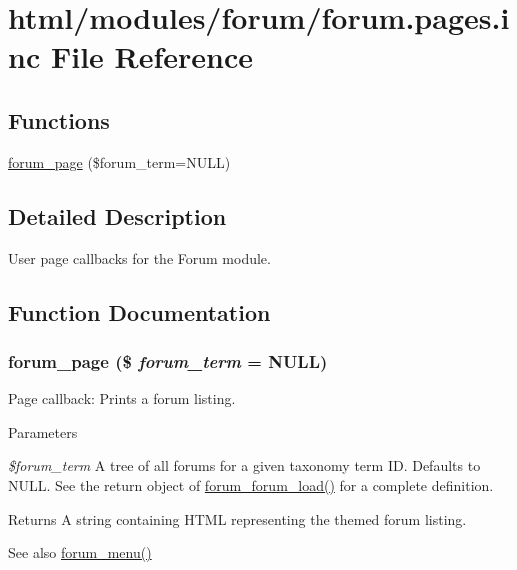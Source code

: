 \hypertarget{forum_8pages_8inc}{
\section{html/modules/forum/forum.pages.inc File Reference}
\label{forum_8pages_8inc}
}
\subsection*{Functions}
\begin{DoxyCompactItemize}
\item 
\hyperlink{forum_8pages_8inc_a35281b2dcd8b53cf56c2bbf41e94abab}{forum\_\-page} (\$forum\_\-term=NULL)
\end{DoxyCompactItemize}


\subsection{Detailed Description}
User page callbacks for the Forum module. 

\subsection{Function Documentation}
\hypertarget{forum_8pages_8inc_a35281b2dcd8b53cf56c2bbf41e94abab}{
\subsubsection[{forum\_\-page}]{\setlength{\rightskip}{0pt plus 5cm}forum\_\-page (\$ {\em forum\_\-term} = {\ttfamily NULL})}}
\label{forum_8pages_8inc_a35281b2dcd8b53cf56c2bbf41e94abab}
Page callback: Prints a forum listing.


\begin{DoxyParams}{Parameters}
\item[{\em \$forum\_\-term}]A tree of all forums for a given taxonomy term ID. Defaults to NULL. See the return object of \hyperlink{forum_8module_afb6e17e15a5d0b24b812a6f628e4583f}{forum\_\-forum\_\-load()} for a complete definition.\end{DoxyParams}
\begin{DoxyReturn}{Returns}
A string containing HTML representing the themed forum listing.
\end{DoxyReturn}
\begin{DoxySeeAlso}{See also}
\hyperlink{forum_8module_a0421197a60856c7ee2cf2511f0d54ffc}{forum\_\-menu()} 
\end{DoxySeeAlso}
